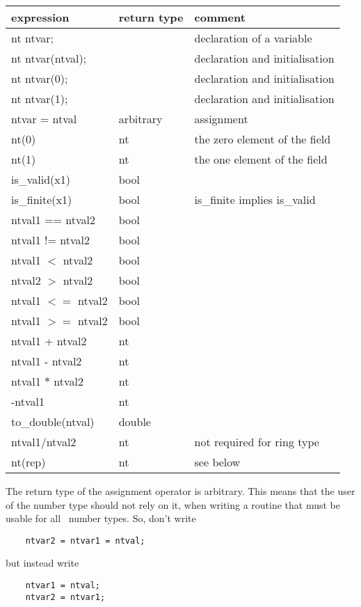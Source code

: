 \documentclass[]{article}
\begin{document}
\begin{tabular}[h]{|l|l|l|}
\hline
expression		& return type	& comment \\
\hline
nt ntvar;		&		& declaration of a variable \\
nt ntvar(ntval);	&		& declaration and initialisation \\
nt ntvar(0);		&		& declaration and initialisation \\
nt ntvar(1);		&		& declaration and initialisation \\

ntvar = ntval		& arbitrary	& assignment   \\
nt(0)			& nt		& the zero element of the field \\
nt(1)			& nt		& the one element of the field \\

is\_valid(x1)		& bool		& \\
is\_finite(x1)		& bool		& is\_finite implies is\_valid \\

ntval1 == ntval2	& bool		& \\
ntval1 != ntval2	& bool		& \\
ntval1 $<$ ntval2	& bool		& \\
ntval2 $>$ ntval2	& bool		& \\
ntval1 $<=$ ntval2	& bool		& \\
ntval1 $>=$ ntval2	& bool		& \\

ntval1 + ntval2		& nt		& \\
ntval1 - ntval2		& nt		& \\
ntval1 $*$ ntval2	& nt		& \\
-ntval1			& nt		& \\

to\_double(ntval)	& double	& \\
\hline
ntval1/ntval2		& nt		& not required for ring type\\
\hline
nt(rep)			& nt		& see below\\
\hline
\end{tabular}

The return type of the assignment operator is arbitrary.
This means that the user of the number type should not rely on it,
when writing a routine that must be usable for all \cgal\ number types.
So, don't write
\begin{verbatim}
    ntvar2 = ntvar1 = ntval;
\end{verbatim}
but instead write
\begin{verbatim}
    ntvar1 = ntval;
    ntvar2 = ntvar1;
\end{verbatim}
\end{document}
